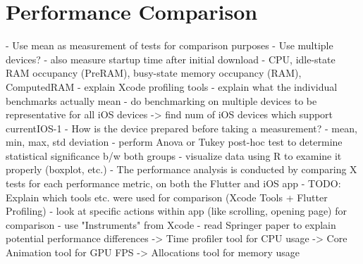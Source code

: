 \chapter{Performance Comparison}
- Use mean as measurement of tests for comparison purposes
- Use multiple devices?
- also measure startup time after initial download
- CPU, idle-state RAM occupancy (PreRAM), busy-state memory occupancy (RAM), ComputedRAM
- explain Xcode profiling tools
- explain what the individual benchmarks actually mean
- do benchmarking on multiple devices to be representative for all iOS devices -> find num of iOS devices which support currentIOS-1
- How is the device prepared before taking a measurement?
- mean, min, max, std deviation
- perform Anova or Tukey post-hoc test to determine statistical significance b/w both groups
- visualize data using R to examine it properly (boxplot, etc.)
- The performance analysis is conducted by comparing X tests for each performance metric, on both the Flutter and iOS app
- TODO: Explain which tools etc. were used for comparison (Xcode Tools + Flutter Profiling)
- look at specific actions within app (like scrolling, opening page) for comparison
- use "Instruments" from Xcode
- read Springer paper to explain potential performance differences
-> Time profiler tool for CPU usage
-> Core Animation tool for GPU FPS
-> Allocations tool for memory usage